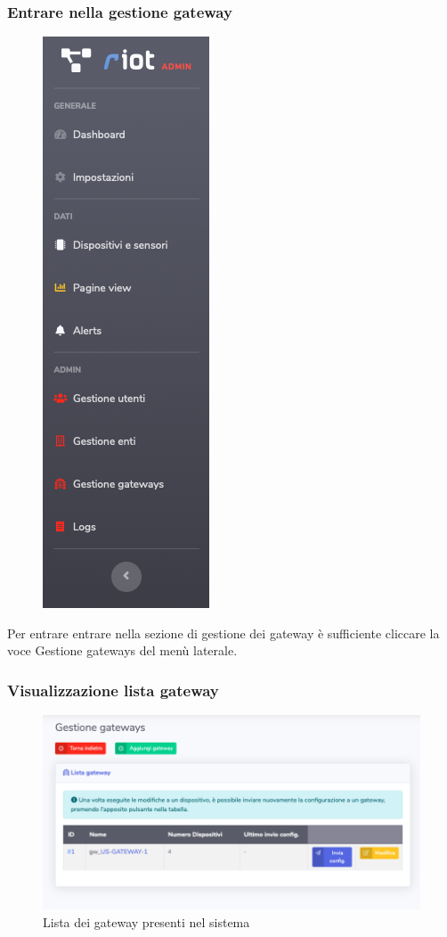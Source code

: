 	\subsubsection{Entrare nella gestione gateway}

		\begin{figure}[H]
		\centering
		\includegraphics[scale=0.600]{res/images/admin/menuGateway.png}
		\caption{}
	\end{figure}

		Per entrare entrare nella sezione di gestione dei gateway è sufficiente cliccare la voce Gestione gateways del menù laterale.

	\subsubsection{Visualizzazione lista gateway}

		\begin{figure}[H]
		\centering
		\includegraphics[scale=0.600]{res/images/admin/listaGateway.png}
		\caption{Lista dei gateway presenti nel sistema}
	\end{figure}

